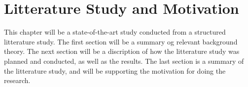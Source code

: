
\chapter{Litterature Study and Motivation}

  This chapter will be a state-of-the-art study conducted from a structured litterature study.
  The first section will be a summary og relevant background theory. The next section will be a
  discription of how the litterature study was planned and conducted, as well as the results. 
  The last section is a summary of the litterature study, and will be supporting the motivation
  for doing the research. 

 
  
  